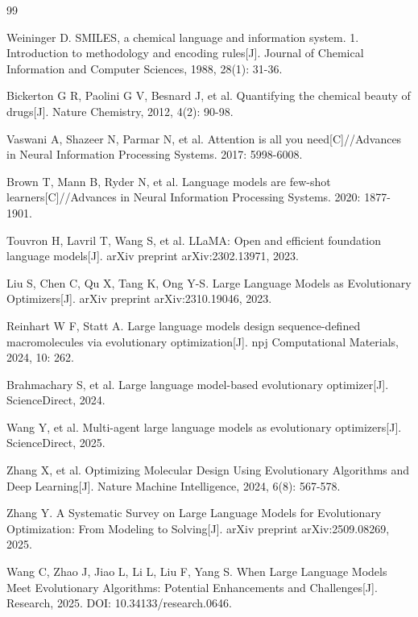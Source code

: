 
\begin{thebibliography}{99}

Weininger D. SMILES, a chemical language and information system. 1. Introduction to methodology and encoding rules[J]. Journal of Chemical Information and Computer Sciences, 1988, 28(1): 31-36.

Bickerton G R, Paolini G V, Besnard J, et al. Quantifying the chemical beauty of drugs[J]. Nature Chemistry, 2012, 4(2): 90-98.

Vaswani A, Shazeer N, Parmar N, et al. Attention is all you need[C]//Advances in Neural Information Processing Systems. 2017: 5998-6008.

Brown T, Mann B, Ryder N, et al. Language models are few-shot learners[C]//Advances in Neural Information Processing Systems. 2020: 1877-1901.

Touvron H, Lavril T, Wang S, et al. LLaMA: Open and efficient foundation language models[J]. arXiv preprint arXiv:2302.13971, 2023.

Liu S, Chen C, Qu X, Tang K, Ong Y-S. Large Language Models as Evolutionary Optimizers[J]. arXiv preprint arXiv:2310.19046, 2023.

Reinhart W F, Statt A. Large language models design sequence-defined macromolecules via evolutionary optimization[J]. npj Computational Materials, 2024, 10: 262.

Brahmachary S, et al. Large language model-based evolutionary optimizer[J]. ScienceDirect, 2024.

Wang Y, et al. Multi-agent large language models as evolutionary optimizers[J]. ScienceDirect, 2025.

Zhang X, et al. Optimizing Molecular Design Using Evolutionary Algorithms and Deep Learning[J]. Nature Machine Intelligence, 2024, 6(8): 567-578.

Zhang Y. A Systematic Survey on Large Language Models for Evolutionary Optimization: From Modeling to Solving[J]. arXiv preprint arXiv:2509.08269, 2025.

Wang C, Zhao J, Jiao L, Li L, Liu F, Yang S. When Large Language Models Meet Evolutionary Algorithms: Potential Enhancements and Challenges[J]. Research, 2025. DOI: 10.34133/research.0646.


\end{thebibliography}
